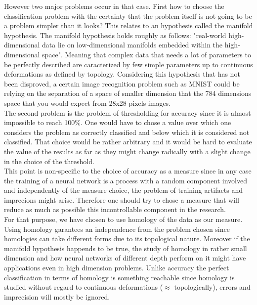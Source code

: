 \documentclass[12pt, a4paper]{article}
\begin{document}
However two major problems occur in that case. First how to choose the classification problem with the certainty that the problem itself is not going to be a problem simpler than it looks? This relates to an hypothesis called the manifold hypothesis. The manifold hypothesis holds roughly as follows: "real-world high-dimensional data lie on low-dimensional manifolds embedded within the high-dimensional space". Meaning that complex data that needs a lot of parameters to be perfectly described are caracterized by few simple parameters up to continuous deformations as defined by topology. Considering this hypothesis that has not been disproved, a certain image recognition problem such as MNIST could be relying on the separation of a space of smaller dimension that the 784 dimensions space that you would expect from 28x28 pixels images.\\

The second problem is the problem of thresholding for accuracy since it is almost impossible to reach 100\%. One would have to chose a value over which one considers the problem as correctly classified and below which it is considered not classified. That choice would be rather arbitrary and it would be hard to evaluate the value of the results as far as they might change radically with a slight change in the choice of the threshold.\\

This point is non-specific to the choice of accuracy as a measure since in any case the training of a neural network is a process with a random component involved and independently of the measure choice, the problem of training artifacts and imprecions might arise. Therefore one should try to chose a measure that will reduce as much as possible this incontrollable component in the research.\\

For that purpose, we have chosen to use homology of the data as our measure. Using homology garantees an independence from the problem chosen since homologies can take different forms due to its topological nature. Moreover if the manifold hypothesis happends to be true, the study of homology in rather small dimension and how neural networks of different depth perform on it might have applications even in high dimension problems. Unlike accuracy the perfect classification in terms of homology is something reachable since homology is studied without regard to continuous deformations ($\approx$ topologically), errors and imprecision will mostly be ignored.\\
\end{document}
